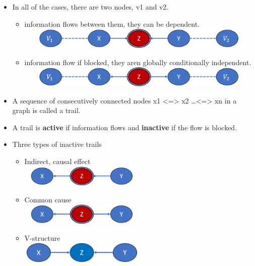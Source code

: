 \documentclass[11pt,a4paper]{report}
\begin{document}
\begin{itemize}
    \item In all of the cases, there are two nodes, v1 and v2.
    \begin{itemize}
        \item information flows between them, they can be dependent.\\
        \vspace{0.5cm}
        \includegraphics[width = 12cm, height = 1cm]{global_indep7.png}
        \item information flow if blocked, they aren globally conditionally independent.\\
        \vspace{0.5cm}
        \includegraphics[width = 12cm, height = 1cm]{global_indep4.png}
    \end{itemize}
    \item A sequence of consecutively connected nodes x1 <=> x2 \ldots <=> xn in a graph is called a trail.
    \item A trail is \textbf{active} if information flows and \textbf{inactive} if the flow is blocked.
    \item Three types of inactive trails
    \begin{itemize}
        \item Indirect, causal effect\\
        \includegraphics[width = 6cm, height = 1cm]{inactive_t1.png}
        \item Common cause\\
        \includegraphics[width = 6cm, height = 1cm]{inactive_t2.png}
        \item V-structure\\
        \includegraphics[width = 6cm, height = 1cm]{inactive_t3.png}

\end{itemize}
\end{itemize}
\end{document}
